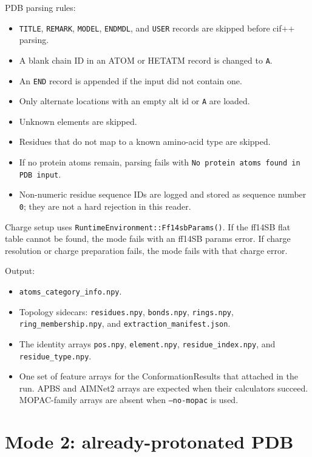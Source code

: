\documentclass[11pt]{article}
\begin{document}
PDB parsing rules:

\begin{itemize}
\item \texttt{TITLE}, \texttt{REMARK}, \texttt{MODEL}, \texttt{ENDMDL}, and
  \texttt{USER} records are skipped before cif++ parsing.
\item A blank chain ID in an ATOM or HETATM record is changed to \texttt{A}.
\item An \texttt{END} record is appended if the input did not contain one.
\item Only alternate locations with an empty alt id or \texttt{A} are loaded.
\item Unknown elements are skipped.
\item Residues that do not map to a known amino-acid type are skipped.
\item If no protein atoms remain, parsing fails with
  \texttt{No protein atoms found in PDB input}.
\item Non-numeric residue sequence IDs are logged and stored as sequence
  number \texttt{0}; they are not a hard rejection in this reader.
\end{itemize}

Charge setup uses \texttt{RuntimeEnvironment::Ff14sbParams()}. If the ff14SB
flat table cannot be found, the mode fails with an ff14SB params error. If
charge resolution or charge preparation fails, the mode fails with that charge
error.

Output:

\begin{itemize}
\item \texttt{atoms\_category\_info.npy}.
\item Topology sidecars: \texttt{residues.npy}, \texttt{bonds.npy},
  \texttt{rings.npy}, \texttt{ring\_membership.npy}, and
  \texttt{extraction\_manifest.json}.
\item The identity arrays \texttt{pos.npy}, \texttt{element.npy},
  \texttt{residue\_index.npy}, and \texttt{residue\_type.npy}.
\item One set of feature arrays for the ConformationResults that attached in
  the run. APBS and AIMNet2 arrays are expected when their calculators
  succeed. MOPAC-family arrays are absent when \texttt{--no-mopac} is used.
\end{itemize}

\section{Mode 2: already-protonated PDB}
\end{document}
